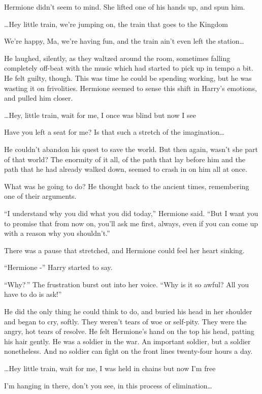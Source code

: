 Hermione didn’t seem to mind. She lifted one of his hands up, and spun him.

…Hey little train, we’re jumping on, the train that goes to the Kingdom

We’re happy, Ma, we’re having fun, and the train ain’t even left the station…

He laughed, silently, as they waltzed around the room, sometimes falling completely off-beat with the music which had started to pick up in tempo a bit. He felt guilty, though. This was time he could be spending working, but he was wasting it on frivolities. Hermione seemed to sense this shift in Harry’s emotions, and pulled him closer.

…Hey, little train, wait for me, I once was blind but now I see

Have you left a seat for me? Is that such a stretch of the imagination…

He couldn’t abandon his quest to save the world. But then again, wasn’t she part of that world? The enormity of it all, of the path that lay before him and the path that he had already walked down, seemed to crash in on him all at once.

What was he going to do? He thought back to the ancient times, remembering one of their arguments.

“I understand why you did what you did today,” Hermione said. “But I want you to promise that from now on, you’ll ask me first, always, even if you can come up with a reason why you shouldn’t.”

There was a pause that stretched, and Hermione could feel her heart sinking.

“Hermione -” Harry started to say.

“Why? ” The frustration burst out into her voice. “Why is it so awful? All you have to do is ask!”

He did the only thing he could think to do, and buried his head in her shoulder and began to cry, softly. They weren’t tears of woe or self-pity. They were the angry, hot tears of resolve. He felt Hermione’s hand on the top his head, patting his hair gently. He was a soldier in the war. An important soldier, but a soldier nonetheless. And no soldier can fight on the front lines twenty-four hours a day.

…Hey little train, wait for me, I was held in chains but now I’m free

I’m hanging in there, don’t you see, in this process of elimination…

